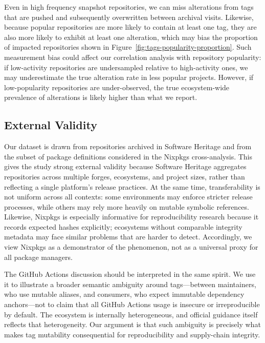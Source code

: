 Even in high frequency snapshot repositories, we can miss alterations from tags that are pushed and subsequently overwritten between archival visits.
Likewise, because popular repositories are more likely to contain at least one tag, they are also more likely to exhibit at least one alteration, which may bias the proportion of impacted repositories shown in Figure~\ref{fig:tags-popularity-proportion}.
Such measurement bias could affect our correlation analysis with repository popularity: if low-activity repositories are undersampled relative to high-activity ones, we may underestimate the true alteration rate in less popular projects.
However, if low-popularity repositories are under-observed, the true ecosystem-wide prevalence of alterations is likely higher than what we report.

\subsection{External Validity}
\label{subsec:tags-val-generalizability}

Our dataset is drawn from repositories archived in Software Heritage and from the subset of package definitions considered in the Nixpkgs cross-analysis.
This gives the study strong external validity because Software Heritage aggregates repositories across multiple forges, ecosystems, and project sizes, rather than reflecting a single platform's release practices.
At the same time, transferability is not uniform across all contexts: some environments may enforce stricter release processes, while others may rely more heavily on mutable symbolic references.
Likewise, Nixpkgs is especially informative for reproducibility research because it records expected hashes explicitly; ecosystems without comparable integrity metadata may face similar problems that are harder to detect.
Accordingly, we view Nixpkgs as a demonstrator of the phenomenon, not as a universal proxy for all package managers.

The GitHub Actions discussion should be interpreted in the same spirit.
We use it to illustrate a broader semantic ambiguity around tags---between maintainers, who use mutable aliases, and consumers, who expect immutable dependency anchors---not to claim that all GitHub Actions usage is insecure or irreproducible by default.
The ecosystem is internally heterogeneous, and official guidance itself reflects that heterogeneity.
Our argument is that such ambiguity is precisely what makes tag mutability consequential for reproducibility and supply-chain integrity.

